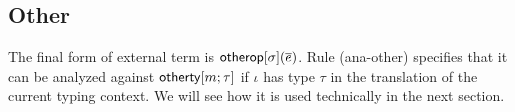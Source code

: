 \documentclass[10pt,preprint]{sigplanconf}
\newtheorem{lemma}{Lemma}
\newtheorem{definition}{Definition}
\begin{document}
\subsection{Other} The final form of external term is $\eother{\st}{\es}$. Rule (ana-other) specifies that it can be analyzed against $\sotherty{m}{\tau}$ if $\iota$ has type $\tau$ in the translation of the current typing context. We will see how it is used technically in the next section.
\begin{mathpar}\small

\end{mathpar}




\end{document}
